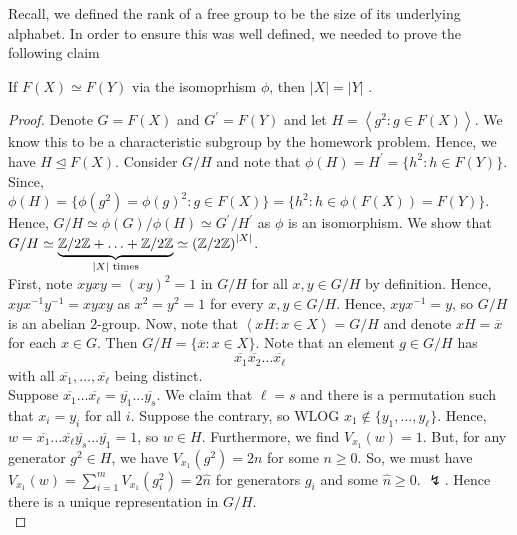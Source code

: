 Recall, we defined the rank of a free group to be the size of its underlying alphabet. In order to ensure this was well defined, we needed to prove the following claim
\begin{proposition}
	If \(F\left( X \right)  \simeq F\left( Y \right) \) via the isomoprhism \(\phi\), then \(\left| X \right|  = \left| Y \right| \) .
\end{proposition}
\begin{proof}
	Denote \(G = F\left( X \right) \) and \(G^{\prime} = F\left( Y \right) \) and let \(H = \left<g^2 : g \in F\left( X \right)  \right> \). We know this to be a characteristic subgroup by the homework problem. Hence, we have \(H \trianglelefteq F\left( X \right) \). Consider \(G / H\)  and note that \(\phi \left( H \right) = H^{\prime} = \{h^2 : h \in F\left( Y \right) \} \). Since, \(\phi\left( H \right)  = \{\phi\left( g^2 \right)  = \phi\left( g \right) ^2 : g \in F\left( X \right) \}  = \{h^2 : h \in \phi\left( F\left( X \right)  \right)  = F\left( Y \right) \} \).
	Hence, \(G / H \simeq \phi\left( G \right)  / \phi\left( H \right)  \simeq G^{\prime} / H^{\prime}\)  as \(\phi\)  is an isomorphism. We show that \(G / H \simeq \underbrace{\mathbb{Z} / 2\mathbb{Z} + \ldots + \mathbb{Z} / 2\mathbb{Z}}_{\left| X \right|  \text{ times}} \simeq \left( \mathbb{Z} / 2\mathbb{Z} \right) ^{\left| X \right| }\).\\
	First, note \(xyxy = \left( xy \right) ^2 = 1 \) in \(G / H\) for all \(x, y \in G / H\)  by definition. Hence, \(xyx^{-1}y^{-1} = xyxy\) as \(x^2 = y^2= 1\) for every \(x, y \in G / H\). Hence, \(xyx^{-1} = y\), so \(G / H\) is an abelian \(2\)-group. Now, note that \(\left<xH : x\in X \right> = G / H \) and denote \(xH = \overline{x}\) for each \(x\in G\). Then \(G / H = \{\overline{x} :  x\in X\} \). Note that an element \(g \in G / H\) has \[
	\overline{x_1}\overline{x_2}\ldots \overline{x_{\ell}}
	\]  with all \(\overline{x_1}, \ldots, \overline{x_{\ell}}\)  being distinct.\\
	Suppose \(\overline{x_1} \ldots \overline{x_{\ell}} = \overline{y_1} \ldots \overline{y_{s}}\). We claim that \(\ell = s\) and there is a permutation such that \(x_{i} = y_{i}\) for all \(i\). Suppose the contrary, so WLOG \(x_1 \not\in \{y_1, \ldots, y_{\ell}\} \). Hence, \(w = \overline{x_1} \ldots \overline{x_{\ell}} \overline{y_{s}} \ldots \overline{y_1} = 1\), so \(w \in H\). Furthermore, we find \(V_{x_1} \left( w \right)  = 1\). But, for any generator \(g^2 \in H\), we have \(V_{x_1}\left( g^2 \right)  = 2n\) for some \(n \ge 0\). So, we must have \(V_{x_1} \left( w \right)  = \sum_{i= 1}^{m} V_{x_1}\left( g_i^2 \right) = 2\hat{n}\) for generators \(g_{i}\) and some \(\hat{n} \ge 0\).     \(\lightning\). Hence there is a unique representation in \(G / H\).\\

\end{proof}
